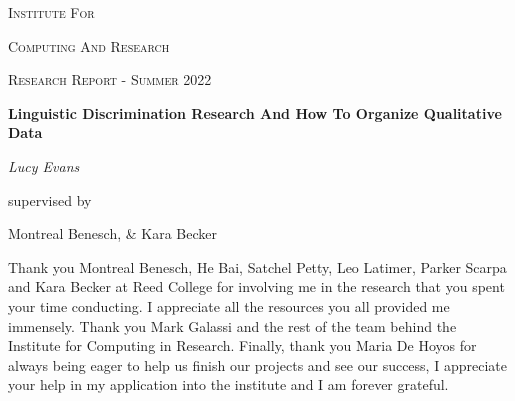 \documentclass{scrartcl}
\begin{document}
\begin{titlepage}
	\centering
	\vspace{2cm}
	{\scshape\LARGE Institute For \par}  %
	{\scshape\LARGE Computing And Research \par}      %
	\vspace{1cm}
	{\scshape\Large Research Report - Summer 2022\par}
	\vfill
	
	{\huge\bfseries Linguistic Discrimination Research And How To Organize Qualitative Data
\par}
	\vfill
	
	{\Large\itshape Lucy Evans \\}\par
	\vspace{1.5cm}

	\vfill
	supervised by\par
	Montreal Benesch, \& Kara Becker


	\vfill
\end{titlepage}

\newpage

\vspace{1cm}

\LARGE\begin{acknowledgements}
\LARGE Thank you Montreal Benesch, He Bai, Satchel Petty, Leo Latimer, Parker Scarpa and Kara Becker at Reed College for involving me in the research that you spent your time conducting. I appreciate all the resources you all provided me immensely. Thank you Mark Galassi and the rest of the team behind the Institute for Computing in Research. Finally, thank you Maria De Hoyos for always being eager to help us finish our projects and see our success, I appreciate your help in my application into the institute and I am forever grateful. 
\end{acknowledgements}

\newpage


\LARGE\begin{abstract}
            A team of researchers at Reed College developed a Qualtrics survey to conduct research on linguistic discrimination in a Portland liberal arts college. Using RStudio their research is visualized and easily understandable with the user-friendliness of RStudio and the helpful aspects the program provides.
\end{abstract}
\vspace{1cm}
\end{document}
